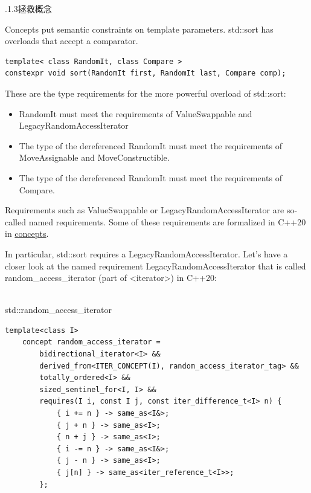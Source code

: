 .1.3\hspace{0.2cm}拯救概念

Concepts put semantic constraints on template parameters. std::sort has overloads that accept a comparator.

\begin{lstlisting}[style=styleCXX]
template< class RandomIt, class Compare >
constexpr void sort(RandomIt first, RandomIt last, Compare comp);
\end{lstlisting}

These are the type requirements for the more powerful overload of std::sort:

\begin{itemize}
\item 
RandomIt must meet the requirements of ValueSwappable and LegacyRandomAccessIterator

\item 
The type of the dereferenced RandomIt must meet the requirements of MoveAssignable and MoveConstructible.

\item 
The type of the dereferenced RandomIt must meet the requirements of Compare.
\end{itemize}

Requirements such as ValueSwappable or LegacyRandomAccessIterator are so-called named requirements. Some of these requirements are formalized in C++20 in \href{https://en.cppreference.com/w/cpp/language/constraints}{concepts}.

In particular, std::sort requires a LegacyRandomAccessIterator. Let’s have a closer look at the named requirement LegacyRandomAccessIterator that is called random\_access\_iterator (part of <iterator>) in C++20:

\hspace*{\fill} \\ %
\noindent
std::random\_access\_iterator
\begin{lstlisting}[style=styleCXX]
template<class I>
	concept random_access_iterator =
		bidirectional_iterator<I> &&
		derived_from<ITER_CONCEPT(I), random_access_iterator_tag> &&
		totally_ordered<I> &&
		sized_sentinel_for<I, I> &&
		requires(I i, const I j, const iter_difference_t<I> n) {
			{ i += n } -> same_as<I&>;
			{ j + n } -> same_as<I>;
			{ n + j } -> same_as<I>;
			{ i -= n } -> same_as<I&>;
			{ j - n } -> same_as<I>;
			{ j[n] } -> same_as<iter_reference_t<I>>;
		};
\end{lstlisting}

